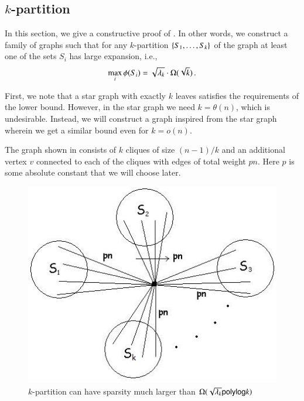 \documentclass[11pt]{article}
\begin{document}
\subsection{$k$-partition}

In this section, we give a constructive proof of
.  In other words, we construct
a family of graphs such that for any $k$-partition $\left\{S_1, \ldots,
S_k\right\}$ of the graph at least one of the sets $S_i$ has large expansion,
i.e., 
\[ \max_i \phi(S_i) =  \sqrt{\lambda_k} \cdot
	\Omega(\sqrt{k}) \,. \]

First, we note that a star graph with exactly $k$ leaves satisfies the
requirements of the lower bound.  However, in the star graph we need $k = \theta(n)$, which is undesirable.  Instead, we will
construct a graph inspired from the star graph wherein we get a
similar bound even for $k = o(n)$.

The graph shown in  consists of $k$
cliques of size $(n-1)/k$ and an additional vertex $v$ connected to
each of the cliques with edges of total weight $pn$.  Here $p$
is some absolute constant that we will choose later.
\begin{figure}[htp]
\centering
\includegraphics[scale=0.8]{minmaxcounter.JPG}
\caption{$k$-partition can have sparsity much larger than $\Omega(\sqrt{\lambda_k} {\sf polylog} k)$ }
\label{fig:minmaxcounter}
\end{figure}
\end{document}
